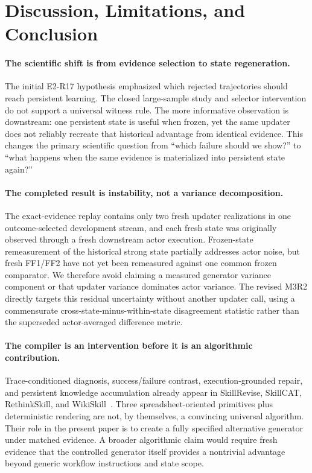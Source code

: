 \section{Discussion, Limitations, and Conclusion}
\label{sec:discussion}

\paragraph{The scientific shift is from evidence selection to state regeneration.}
The initial E2-R17 hypothesis emphasized which rejected trajectories should reach persistent learning. The closed large-sample study and selector intervention do not support a universal witness rule. The more informative observation is downstream: one persistent state is useful when frozen, yet the same updater does not reliably recreate that historical advantage from identical evidence. This changes the primary scientific question from ``which failure should we show?'' to ``what happens when the same evidence is materialized into persistent state again?''

\paragraph{The completed result is instability, not a variance decomposition.}
The exact-evidence replay contains only two fresh updater realizations in one outcome-selected development stream, and each fresh state was originally observed through a fresh downstream actor execution. Frozen-state remeasurement of the historical strong state partially addresses actor noise, but fresh FF1/FF2 have not yet been remeasured against one common frozen comparator. We therefore avoid claiming a measured generator variance component or that updater variance dominates actor variance. The revised M3R2 directly targets this residual uncertainty without another updater call, using a commensurate cross-state-minus-within-state disagreement statistic rather than the superseded actor-averaged difference metric.

\paragraph{The compiler is an intervention before it is an algorithmic contribution.}
Trace-conditioned diagnosis, success/failure contrast, execution-grounded repair, and persistent knowledge accumulation already appear in SkillRevise, SkillCAT, RethinkSkill, and WikiSkill~\citep{liu2026skillrevise,chen2026skillcat,liu2026rethinkskill,tang2026wikiskill}. Three spreadsheet-oriented primitives plus deterministic rendering are not, by themselves, a convincing universal algorithm. Their role in the present paper is to create a fully specified alternative generator under matched evidence. A broader algorithmic claim would require fresh evidence that the controlled generator itself provides a nontrivial advantage beyond generic workflow instructions and state scope.

